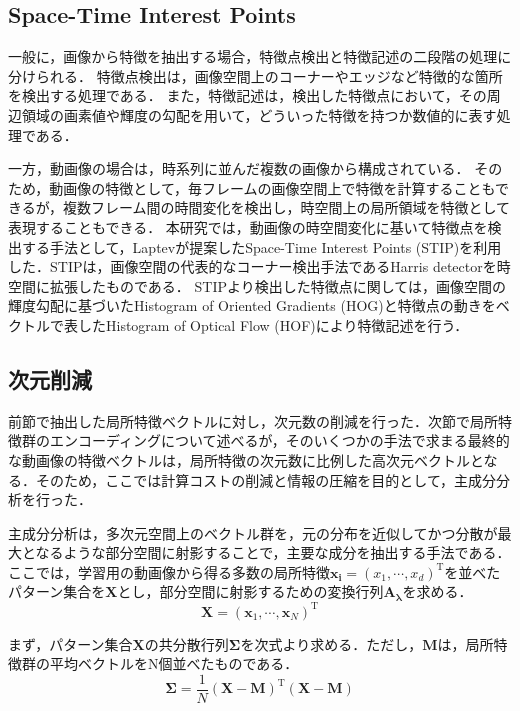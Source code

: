 \subsection{Space-Time Interest Points}
一般に，画像から特徴を抽出する場合，特徴点検出と特徴記述の二段階の処理に分けられる．
特徴点検出は，画像空間上のコーナーやエッジなど特徴的な箇所を検出する処理である．
また，特徴記述は，検出した特徴点において，その周辺領域の画素値や輝度の勾配を用いて，どういった特徴を持つか数値的に表す処理である．

一方，動画像の場合は，時系列に並んだ複数の画像から構成されている．
そのため，動画像の特徴として，毎フレームの画像空間上で特徴を計算することもできるが，複数フレーム間の時間変化を検出し，時空間上の局所領域を特徴として表現することもできる．
本研究では，動画像の時空間変化に基いて特徴点を検出する手法として，Laptevが提案したSpace-Time Interest Points (STIP)\cite{stip}を利用した．STIPは，画像空間の代表的なコーナー検出手法であるHarris detectorを時空間に拡張したものである．
STIPより検出した特徴点に関しては，画像空間の輝度勾配に基づいたHistogram of Oriented Gradients (HOG)と特徴点の動きをベクトルで表したHistogram of Optical Flow (HOF)により特徴記述を行う．

\subsection{次元削減}
前節で抽出した局所特徴ベクトルに対し，次元数の削減を行った．次節で局所特徴群のエンコーディングについて述べるが，そのいくつかの手法で求まる最終的な動画像の特徴ベクトルは，局所特徴の次元数に比例した高次元ベクトルとなる．そのため，ここでは計算コストの削減と情報の圧縮を目的として，主成分分析を行った．

主成分分析は，多次元空間上のベクトル群を，元の分布を近似してかつ分散が最大となるような部分空間に射影することで，主要な成分を抽出する手法である．ここでは，学習用の動画像から得る多数の局所特徴$ \bm{x_i} = \left( x_1, \cdots, x_d \right)^{\mathrm{T}} $を並べたパターン集合を$ \bm{X} $とし，部分空間に射影するための変換行列$ \bm{A_{\lambda}} $を求める．
%
\begin{equation}
{
  \bm{X} = \left( \bm{x}_1, \cdots, \bm{x}_N \right)^{\mathrm{T}}
}
\end{equation}

まず，パターン集合$ \bm{X} $の共分散行列$ \bm{\Sigma} $を次式より求める．ただし，$ \bm{M} $は，局所特徴群の平均ベクトルをN個並べたものである．
%
\begin{equation}
{
  \bm{\Sigma} =
  \frac{1}{N}\left(\bm{X}-\bm{M}\right)^{\mathrm{T}}\left(\bm{X}-\bm{M}\right)
}
\end{equation}


